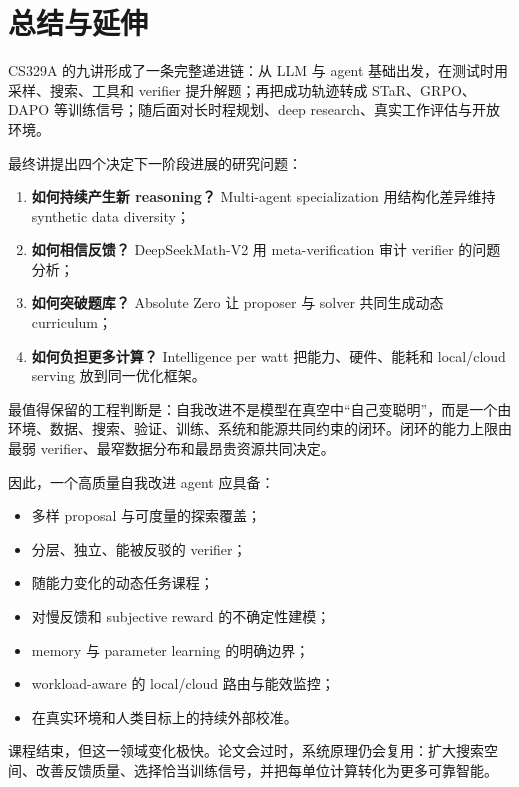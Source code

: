 \section{总结与延伸}

CS329A 的九讲形成了一条完整递进链：从 LLM 与 agent 基础出发，在测试时用采样、搜索、工具和 verifier 提升解题；再把成功轨迹转成 STaR、GRPO、DAPO 等训练信号；随后面对长时程规划、deep research、真实工作评估与开放环境。

最终讲提出四个决定下一阶段进展的研究问题：

\begin{enumerate}
    \item \textbf{如何持续产生新 reasoning？} Multi-agent specialization 用结构化差异维持 synthetic data diversity；
    \item \textbf{如何相信反馈？} DeepSeekMath-V2 用 meta-verification 审计 verifier 的问题分析；
    \item \textbf{如何突破题库？} Absolute Zero 让 proposer 与 solver 共同生成动态 curriculum；
    \item \textbf{如何负担更多计算？} Intelligence per watt 把能力、硬件、能耗和 local/cloud serving 放到同一优化框架。
\end{enumerate}

最值得保留的工程判断是：自我改进不是模型在真空中“自己变聪明”，而是一个由环境、数据、搜索、验证、训练、系统和能源共同约束的闭环。闭环的能力上限由最弱 verifier、最窄数据分布和最昂贵资源共同决定。

因此，一个高质量自我改进 agent 应具备：

\begin{itemize}
    \item 多样 proposal 与可度量的探索覆盖；
    \item 分层、独立、能被反驳的 verifier；
    \item 随能力变化的动态任务课程；
    \item 对慢反馈和 subjective reward 的不确定性建模；
    \item memory 与 parameter learning 的明确边界；
    \item workload-aware 的 local/cloud 路由与能效监控；
    \item 在真实环境和人类目标上的持续外部校准。
\end{itemize}

课程结束，但这一领域变化极快。论文会过时，系统原理仍会复用：扩大搜索空间、改善反馈质量、选择恰当训练信号，并把每单位计算转化为更多可靠智能。


